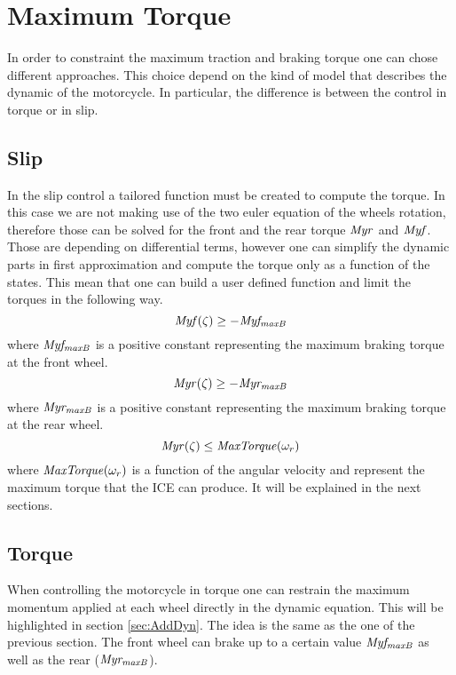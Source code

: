 \section{Maximum Torque}
% 
In order to constraint the maximum traction and braking torque one can chose different approaches. This choice depend on the kind of model that describes the dynamic of the motorcycle. In particular, the difference is between the control in torque or in slip.
%
\subsection{Slip}
%
In the slip control a tailored function must be created to compute the torque. In this case we are not making use of the two euler equation of the wheels rotation, therefore those can be solved for the front and the rear torque $\it Myr$ and $\it Myf$. Those are depending on differential terms, however one can simplify the dynamic parts in first approximation and compute the torque only as a function of the states. This mean that one can build a user defined function and limit the torques in the following way.
%
\begin{equation}
    {\it Myf}(\zeta) \ge -{\it Myf_{maxB}}
\end{equation}
%
where ${\it Myf_{maxB}}$ is a positive constant representing the maximum braking torque at the front wheel.
%
\begin{equation}
    {\it Myr}(\zeta) \ge -{\it Myr_{maxB}}
\end{equation}
%
where ${\it Myr_{maxB}}$ is a positive constant representing the maximum braking torque at the rear wheel.
%
\begin{equation}
    {\it Myr}(\zeta) \le {\it MaxTorque}(\omega_r)
\end{equation}
%
where ${\it MaxTorque}(\omega_r)$ is a function of the angular velocity and represent the maximum torque that the ICE can produce. It will be explained in the next sections.
%
\subsection{Torque}
%
When controlling the motorcycle in torque one can restrain the maximum momentum applied at each wheel directly in the dynamic equation. This will be highlighted in section \ref{sec:AddDyn}. The idea is the same as the one of the previous section. The front wheel can brake up to a certain value ${\it Myf_{maxB}}$ as well as the rear (${\it Myr_{maxB}}$).
%
